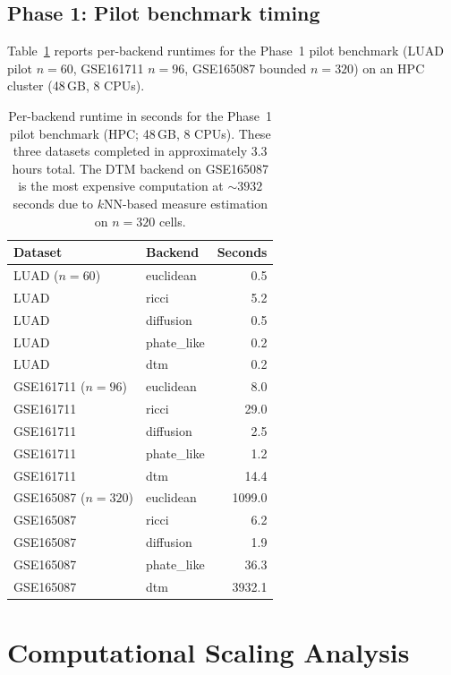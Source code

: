 \documentclass[11pt]{article}
\begin{document}
\subsection{Phase 1: Pilot benchmark timing}

Table~\ref{tab:supp_timing} reports per-backend runtimes for the Phase~1 pilot benchmark (LUAD pilot $n=60$, GSE161711 $n=96$, GSE165087 bounded $n=320$) on an HPC cluster (48\,GB, 8 CPUs).

\begin{table}[h]
\centering
\small
\begin{tabular}{llr}
\toprule
Dataset & Backend & Seconds \\
\midrule
LUAD ($n=60$) & euclidean & 0.5 \\
LUAD & ricci & 5.2 \\
LUAD & diffusion & 0.5 \\
LUAD & phate\_like & 0.2 \\
LUAD & dtm & 0.2 \\
\midrule
GSE161711 ($n=96$) & euclidean & 8.0 \\
GSE161711 & ricci & 29.0 \\
GSE161711 & diffusion & 2.5 \\
GSE161711 & phate\_like & 1.2 \\
GSE161711 & dtm & 14.4 \\
\midrule
GSE165087 ($n=320$) & euclidean & 1099.0 \\
GSE165087 & ricci & 6.2 \\
GSE165087 & diffusion & 1.9 \\
GSE165087 & phate\_like & 36.3 \\
GSE165087 & dtm & 3932.1 \\
\bottomrule
\end{tabular}
\caption{Per-backend runtime in seconds for the Phase~1 pilot benchmark (HPC; 48\,GB, 8 CPUs).
These three datasets completed in approximately 3.3 hours total.
The DTM backend on GSE165087 is the most expensive computation at ${\sim}3932$ seconds due to $k$NN-based measure estimation on $n = 320$ cells.}
\label{tab:supp_timing}
\end{table}


\section{Computational Scaling Analysis}
\label{sec:supp_scaling}
\end{document}
